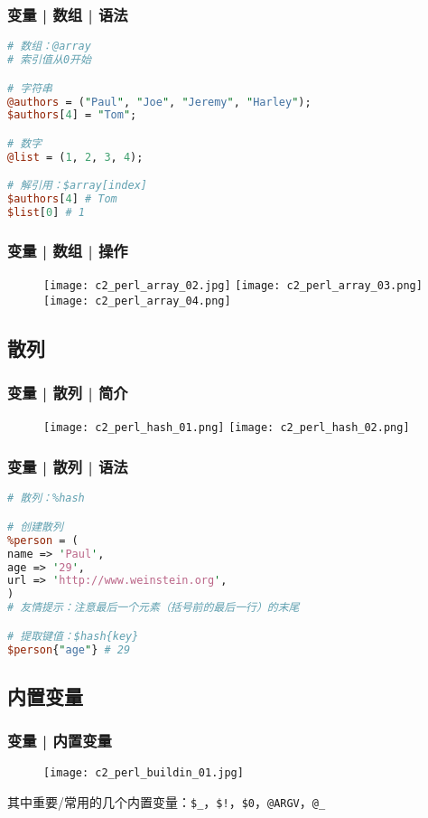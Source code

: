 \begin{frame}[fragile]
  \frametitle{变量 | 数组 | \alert{语法}}
  \vspace{-1.5em}
\begin{lstlisting}[language=Perl]
# 数组：@array
# 索引值从0开始

# 字符串
@authors = ("Paul", "Joe", "Jeremy", "Harley");
$authors[4] = "Tom";

# 数字
@list = (1, 2, 3, 4);

# 解引用：$array[index]
$authors[4] # Tom
$list[0] # 1
\end{lstlisting}
\end{frame}

\begin{frame}
  \frametitle{变量 | 数组 | \alert{操作}}
  \begin{figure}
    \centering
    \texttt{[image: c2\_perl\_array\_02.jpg]}
    \vspace{0.5cm}
    \texttt{[image: c2\_perl\_array\_03.png]}
    \texttt{[image: c2\_perl\_array\_04.png]}
  \end{figure}
\end{frame}

\subsection{散列}
\begin{frame}
  \frametitle{变量 | 散列 | 简介}
  \begin{figure}
    \centering
    \texttt{[image: c2\_perl\_hash\_01.png]}\qquad
    \texttt{[image: c2\_perl\_hash\_02.png]}
  \end{figure}
\end{frame}

\begin{frame}[fragile]
  \frametitle{变量 | 散列 | \alert{语法}}
  \vspace{-1.5em}
\begin{lstlisting}[language=Perl]
# 散列：%hash

# 创建散列
%person = (
name => 'Paul',
age => '29',
url => 'http://www.weinstein.org',
)
# 友情提示：注意最后一个元素（括号前的最后一行）的末尾

# 提取键值：$hash{key}
$person{"age"} # 29
\end{lstlisting}
\end{frame}

\subsection{内置变量}
\begin{frame}[fragile]
  \frametitle{变量 | 内置变量}
  \begin{figure}
    \centering
    \texttt{[image: c2\_perl\_buildin\_01.jpg]}
  \end{figure}
  \begin{center}
其中重要/常用的几个\alert{内置变量}：\verb|$_|，\verb|$!|，\verb|$0|，\verb|@ARGV|，\verb|@_|
  \end{center}
\end{frame}

